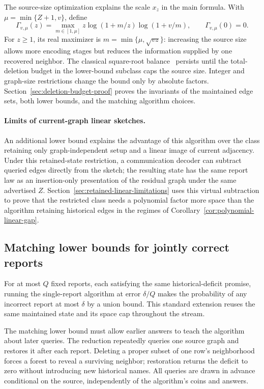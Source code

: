 \documentclass[11pt,letterpaper]{article}
\numberwithin{equation}{section}
\begin{document}
The source-size optimization explains the scale $x_z$ in the main formula.
With $\mu=\min\{Z+1,v\}$, define
\begin{equation}
 \Gamma_{v,\mu}(z)=\max_{m\in[1,\mu]}
       z\log(1+m/z)\log(1+v/m),\qquad \Gamma_{v,\mu}(0)=0.
 \label{eq:graph-envelope-main}
\end{equation}
For $z\ge1$, its real maximizer is $m=\min\{\mu,\sqrt{vz}\}$: increasing the source size allows more encoding stages but reduces the information supplied by one recovered neighbor.
The classical square-root balance~\cite{KNPWWY2017,NelsonYu2019} persists until the total-deletion budget in the lower-bound subclass caps the source size.
Integer and graph-size restrictions change the bound only by absolute factors.
Section~\ref{sec:deletion-budget-proof} proves the invariants of the maintained edge sets, both lower bounds, and the matching algorithm choices.

\paragraph{Limits of current-graph linear sketches.}
An additional lower bound explains the advantage of this algorithm over the class retaining only graph-independent setup and a linear image of current adjacency.
Under this retained-state restriction, a communication decoder can subtract queried edges directly from the sketch; the resulting state has the same report law as an insertion-only presentation of the residual graph under the same advertised $Z$.
Section~\ref{sec:retained-linear-limitations} uses this virtual subtraction to prove that the restricted class needs a polynomial factor more space than the algorithm retaining historical edges in the regimes of Corollary~\ref{cor:polynomial-linear-gap}.

\subsection{Matching lower bounds for jointly correct reports}

For at most $Q$ fixed reports, each satisfying the same historical-deficit promise, running the single-report algorithm at error $\delta/Q$ makes the probability of any incorrect report at most $\delta$ by a union bound.
This standard extension reuses the same maintained state and its space cap throughout the stream.

The matching lower bound must allow earlier answers to teach the algorithm about later queries.
The reduction repeatedly queries one source graph and restores it after each report.
Deleting a proper subset of one row's neighborhood forces a forest to reveal a surviving neighbor; restoration returns the deficit to zero without introducing new historical names.
All queries are drawn in advance conditional on the source, independently of the algorithm's coins and answers.
\end{document}
